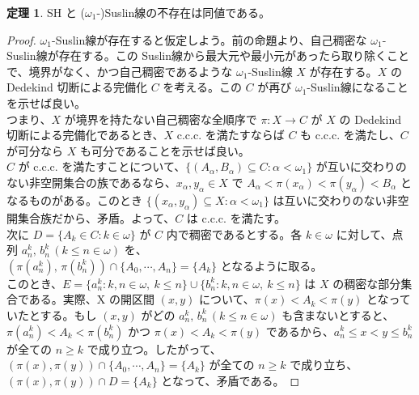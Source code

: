 \documentclass{jsarticle}
\theoremstyle{definition}
\newtheorem{theorem}{定理}[section]
\begin{document}
    \begin{theorem}
        SH と ($\omega_1$-)Suslin線の不存在は同値である。
    \end{theorem}
    \begin{proof}
        $\omega_1$-Suslin線が存在すると仮定しよう。前の命題より、自己稠密な $\omega_1$-Suslin線が存在する。この Suslin線から最大元や最小元があったら取り除くことで、境界がなく、かつ自己稠密であるような $\omega_1$-Suslin線 $X$ が存在する。$X$ の Dedekind 切断による完備化 $C$ を考える。この $C$ が再び $\omega_1$-Suslin線になることを示せば良い。\\
        つまり、$X$ が境界を持たない自己稠密な全順序で $\pi : X \rightarrow C$ が $X$ の Dedekind 切断による完備化であるとき、$X$ c.c.c. を満たすならば $C$ も c.c.c. を満たし、$C$ が可分なら $X$ も可分であることを示せば良い。\\
        $C$ が c.c.c. を満たすことについて、$\{(A_\alpha, B_\alpha) \subseteq C : \alpha < \omega_1\}$ が互いに交わりのない非空開集合の族であるなら、$x_\alpha, y_\alpha \in X$ で $A_\alpha < \pi(x_\alpha) < \pi(y_\alpha) < B_\alpha$ となるものがある。このとき $\{(x_\alpha, y_\alpha) \subseteq X : \alpha < \omega_1\}$ は互いに交わりのない非空開集合族だから、矛盾。よって、$C$ は c.c.c. を満たす。\\
        次に $D = \{A_k \in C : k \in \omega\}$ が $C$ 内で稠密であるとする。各 $k \in \omega$ に対して、点列 $a^k_n, \, b^k_n \, (k \leq n \in \omega)$ を、\\
        $(\pi(a^k_n), \, \pi(b^k_n)) \cap \{A_0, \cdots, A_n\} = \{A_k\}$ となるように取る。\\
        このとき、$E = \{a^k_n : k,n\in\omega, \ k \leq n\} \cup \{b^k_n : k,n\in\omega, \ k \leq n\}$ は $X$ の稠密な部分集合である。実際、X の開区間 $(x, y)$ について、$\pi(x) < A_k < \pi(y)$ となっていたとする。もし $(x, y)$ がどの $a^k_n, \, b^k_n \, (k \leq n \in \omega)$ も含まないとすると、$\pi(a^k_n) < A_k < \pi(b^k_n)$ かつ $\pi(x) < A_k < \pi(y)$ であるから、$a^k_n \leq x < y \leq b^k_n$ が全ての $n \geq k$ で成り立つ。したがって、$(\pi(x), \pi(y)) \cap \{ A_0, \cdots, A_n\} = \{A_k\}$ が全ての $n \geq k$ で成り立ち、$(\pi(x), \pi(y)) \cap D = \{A_k\}$ となって、矛盾である。
    \end{proof}
    
    \newpage
\end{document}
